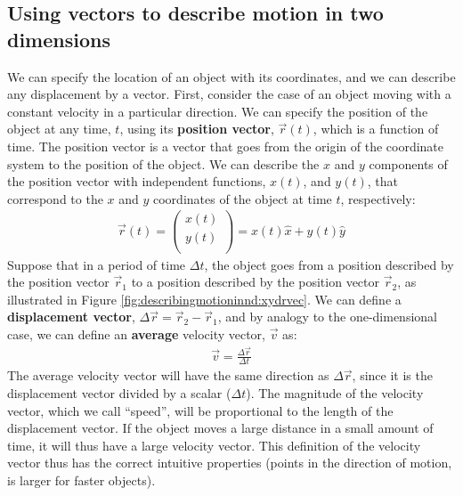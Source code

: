 \subsection{Using vectors to describe motion in two dimensions}
We can specify the location of an object with its coordinates, and we can describe any displacement by a vector. First, consider the case of an object moving with a constant velocity in a particular direction.  We can specify the position of the object at any time, $t$, using its \textbf{position vector}, $\vec r(t)$, which is a function of time. The position vector is a vector that goes from the origin of the coordinate system to the position of the object. We can describe the $x$ and $y$ components of the position vector with independent functions, $x(t)$, and $y(t)$, that correspond to the $x$ and $y$ coordinates of the object at time $t$, respectively:
\begin{align*}
\vec r(t) = \begin{pmatrix}
           x(t) \\
           y(t) \\
         \end{pmatrix}= x(t) \hat x + y(t) \hat y
\end{align*}
Suppose that in a period of time $\Delta t$, the object goes from a position described by the position vector $\vec r_1$ to a position described by the position vector $\vec r_2$, as illustrated in Figure \ref{fig:describingmotioninnd:xydrvec}.
We can define a \textbf{displacement vector}, $\Delta \vec r=\vec r_2-\vec r_1$, and by analogy to the one-dimensional case, we can define an \textbf{average} velocity vector, $\vec v$ as:
\begin{align}
\vec v = \frac{\Delta \vec r}{\Delta t}
\end{align}
The average velocity vector will have the same direction as $\Delta \vec r$, since it is the displacement vector divided by a scalar ($\Delta t$). The magnitude of the velocity vector, which we call ``speed'', will be proportional to the length of the displacement vector. If the object moves a large distance in a small amount of time, it will thus have a large velocity vector. This definition of the velocity vector thus has the correct intuitive properties (points in the direction of motion, is larger for faster objects).

